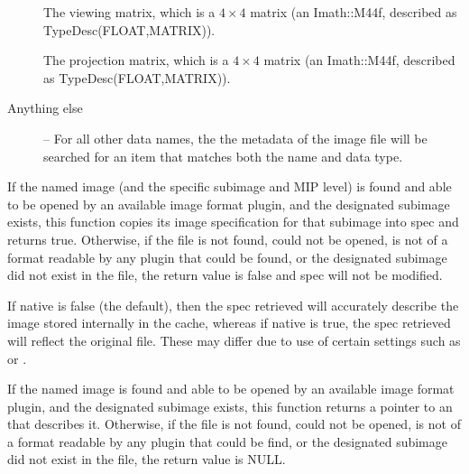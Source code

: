 \begin{description}
\item[\rm {}] The viewing matrix, which is a
$4 \times 4$ matrix (an {\cf Imath::M44f}, described as {\cf
  TypeDesc(FLOAT,MATRIX)}).

\item[\rm {}] The projection matrix, which is a
$4 \times 4$ matrix (an {\cf Imath::M44f}, described as {\cf
  TypeDesc(FLOAT,MATRIX)}).

\item[Anything else] -- For all other data names, the
the metadata of the image file will be searched for an item that
matches both the name and data type.

\end{description}
\apiend


If the named image (and the specific subimage and MIP level) is found and able to be opened by an available
image format plugin, and the designated subimage exists, this function copies
its image specification for that subimage into {\cf spec} and returns
{\cf true}.  Otherwise, if the file is not found, could not be opened,
is not of a format readable by any plugin that could be found, or
the designated subimage did not exist in the file, the return value is
{\cf false} and {\cf spec} will not be modified.

If {\cf native} is {\cf false} (the default), then the spec retrieved
will accurately describe the image stored internally in the cache,
whereas if {\cf native} is {\cf true}, the spec retrieved will reflect
the original file.  These may differ due to use of certain \ImageCache
settings such as  or .

\apiend


If the named image is found and able to be opened by an available
image format plugin, and the designated subimage exists, this function
returns a pointer to an \ImageSpec that describes it.  Otherwise, if the
file is not found, could not be opened, is not of a format readable by
any plugin that could be find, or the designated subimage did
not exist in the file, the return value is NULL.

